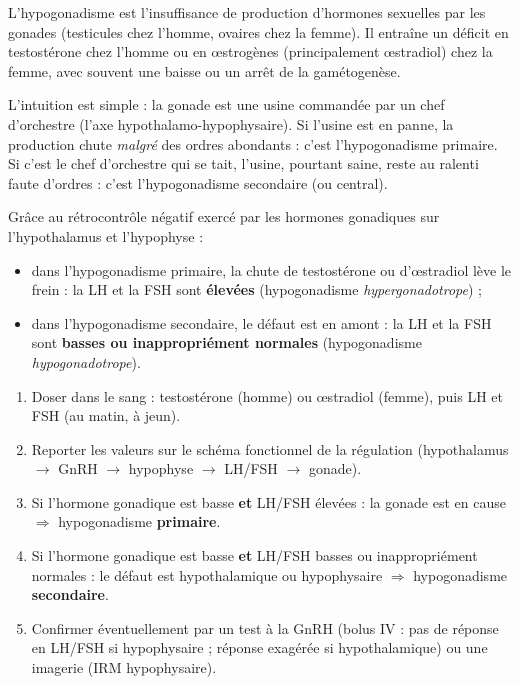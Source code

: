 \documentclass[11pt]{article}
\newcommand{\cle}[1]{{\popxbold\color{popdark}#1}}
\newcounter{popsec}
\newcounter{popsub}
\newcommand{\courssub}[1]{%
  \stepcounter{popsub}%
  \par\vspace{9pt}\noindent{\popxbold\fontsize{11.5}{13}\selectfont\color{popink}{\color{poporange}\thepopsec.\thepopsub}\hspace{6pt}#1}\par\nopagebreak\vspace{4pt}
}
\begin{document}
\courssub{Notion générale : l'hypogonadisme}

\begin{definition}[Hypogonadisme]
L'\cle{hypogonadisme} est l'insuffisance de production d'hormones sexuelles par les gonades (testicules chez l'homme, ovaires chez la femme). Il entraîne un déficit en \cle{testostérone} chez l'homme ou en \cle{œstrogènes} (principalement œstradiol) chez la femme, avec souvent une baisse ou un arrêt de la \cle{gamétogenèse}.
\end{definition}

L'intuition est simple : la gonade est une usine commandée par un chef d'orchestre (l'axe hypothalamo-hypophysaire). Si l'usine est en panne, la production chute \emph{malgré} des ordres abondants : c'est l'hypogonadisme \cle{primaire}. Si c'est le chef d'orchestre qui se tait, l'usine, pourtant saine, reste au ralenti faute d'ordres : c'est l'hypogonadisme \cle{secondaire} (ou central).

\begin{propriete}
Grâce au rétrocontrôle négatif exercé par les hormones gonadiques sur l'hypothalamus et l'hypophyse :
\begin{itemize}
\item dans l'hypogonadisme \cle{primaire}, la chute de testostérone ou d'œstradiol lève le frein : la \cle{LH} et la \cle{FSH} sont \textbf{élevées} (hypogonadisme \emph{hypergonadotrope}) ;
\item dans l'hypogonadisme \cle{secondaire}, le défaut est en amont : la \cle{LH} et la \cle{FSH} sont \textbf{basses ou inappropriément normales} (hypogonadisme \emph{hypogonadotrope}).
\end{itemize}
\end{propriete}

\begin{methode}
\begin{enumerate}
\item Doser dans le sang : \cle{testostérone} (homme) ou \cle{œstradiol} (femme), puis \cle{LH} et \cle{FSH} (au matin, à jeun).
\item Reporter les valeurs sur le schéma fonctionnel de la régulation (hypothalamus $\rightarrow$ GnRH $\rightarrow$ hypophyse $\rightarrow$ LH/FSH $\rightarrow$ gonade).
\item Si l'hormone gonadique est basse \textbf{et} LH/FSH élevées : la gonade est en cause $\Rightarrow$ hypogonadisme \textbf{primaire}.
\item Si l'hormone gonadique est basse \textbf{et} LH/FSH basses ou inappropriément normales : le défaut est hypothalamique ou hypophysaire $\Rightarrow$ hypogonadisme \textbf{secondaire}.
\item Confirmer éventuellement par un test à la GnRH (bolus IV : pas de réponse en LH/FSH si hypophysaire ; réponse exagérée si hypothalamique) ou une imagerie (IRM hypophysaire).
\end{enumerate}
\end{methode}
\end{document}
